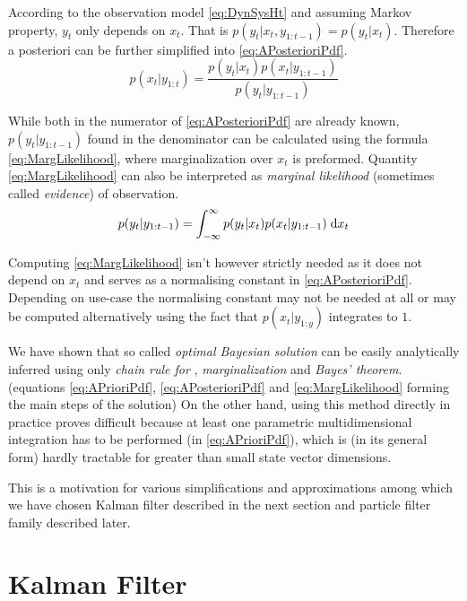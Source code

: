According to the observation model \eqref{eq:DynSysHt} and assuming Markov property, \(y_t\) only
depends on \(x_t\). That is \(p(y_t | x_t, y_{1:t-1}) = p(y_t | x_t)\). Therefore a posteriori
{\pdf} can be further simplified into \eqref{eq:APosterioriPdf}.
\begin{equation} \label{eq:APosterioriPdf}
	p(x_t | y_{1:t}) = \frac{p(y_t | x_t) p(x_t | y_{1:t-1})}{p(y_t | y_{1:t-1})}
\end{equation}

While both {\pdfs} in the numerator of \eqref{eq:APosterioriPdf} are already known, \(p(y_t|y_{1:t-1})\)
found in the denominator can be calculated using the formula \eqref{eq:MargLikelihood}, where
marginalization over \(x_t\) is preformed. Quantity \eqref{eq:MargLikelihood} can also be interpreted as
\emph{marginal likelihood} (sometimes called \emph{evidence}) of observation.~\cite{Smi:10}
\begin{equation} \label{eq:MargLikelihood}
	p(y_t | y_{1:t-1}) = \int_{-\infty}^{\infty} p(y_t | x_t) p(x_t | y_{1:t-1}) \; \mathrm{d}x_{t}
\end{equation}

Computing \eqref{eq:MargLikelihood} isn't however strictly needed as it does not depend on \(x_t\) and
serves as a normalising constant in \eqref{eq:APosterioriPdf}. Depending on use-case the normalising
constant may not be needed at all or may be computed alternatively using the fact that \(p(x_t | y_{1:y})\)
integrates to \(1\).

We have shown that so called \emph{optimal Bayesian solution}\cite{AruMasGor:02} can be easily
analytically inferred using only \emph{chain rule for {\pdfs}}, \emph{marginalization} and
\emph{Bayes' theorem}. (equations \eqref{eq:APrioriPdf}, \eqref{eq:APosterioriPdf} and
\eqref{eq:MargLikelihood} forming the main steps of the solution) On the other hand, using this
method directly in practice proves difficult because at least one parametric multidimensional
integration has to be performed (in \eqref{eq:APrioriPdf}), which is (in its general form) hardly
tractable for greater than small state vector dimensions.

This is a motivation for various simplifications and approximations among which we have chosen
Kalman filter described in the next section and particle filter family described later.

\section{Kalman Filter}

